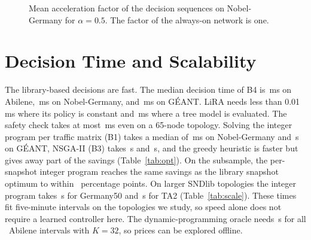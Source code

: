\documentclass[preprint,12pt]{elsarticle}
\begin{document}
\begin{figure}[h!]
\centering
{}
\caption{Mean acceleration factor of the decision sequences on Nobel-Germany for $\alpha=0.5$. The factor of the always-on network is one.}
\label{fig:wear}
\end{figure}


\section{Decision Time and Scalability}\label{sec:res-time}

The library-based decisions are fast. The median decision time of B4 is \abiLatBFour\,ms on Abilene, \nobLatBFour\,ms on Nobel-Germany, and \geaLatBFour\,ms on G\'{E}ANT. LiRA needs less than 0.01\,ms where its policy is constant and \geaLatLiRA\,ms where a tree model is evaluated. The safety check takes at most \safetyTA\,ms even on a 65-node topology. Solving the integer program per traffic matrix (B1) takes a median of \nobIlpMs\,ms on Nobel-Germany and \geaIlpS\,s on G\'{E}ANT, NSGA-II (B3) takes \nobGaS\,s and \geaGaS\,s, and the greedy heuristic is faster but gives away part of the savings (Table~\ref{tab:opt}). On the subsample, the per-snapshot integer program reaches the same savings as the library snapshot optimum to within \boneGapPP\ percentage points. On larger SNDlib topologies the integer program takes \ilpGermany\,s for Germany50 and \ilpTA\,s for TA2 (Table~\ref{tab:scale}). These times fit five-minute intervals on the topologies we study, so speed alone does not require a learned controller here. The dynamic-programming oracle needs \dpRunAbi\,s for all \abiIntervals\ Abilene intervals with $K=32$, so prices can be explored offline.
\end{document}
